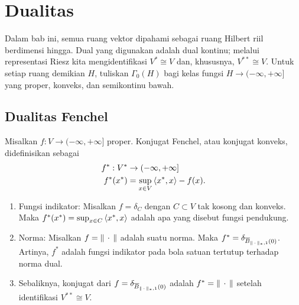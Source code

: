 \chapter{Dualitas}\label{chapter:duality}
Dalam bab ini, semua ruang vektor dipahami sebagai ruang Hilbert riil berdimensi hingga. Dual yang digunakan adalah dual kontinu; melalui representasi Riesz kita mengidentifikasi $V^*\cong V$ dan, khususnya, $V^{**}\cong V$. Untuk setiap ruang demikian $H$, tuliskan $\Gamma_0(H)$ bagi kelas fungsi $H\rightarrow(-\infty,+\infty]$ yang proper, konveks, dan semikontinu bawah.

\section{Dualitas Fenchel}

\begin{defn}
    Misalkan $f:V\rightarrow(-\infty,+\infty]$ proper. Konjugat Fenchel, atau konjugat konveks, didefinisikan sebagai
    \begin{equation}
        \begin{aligned}
            f^*:V^*&\rightarrow(-\infty,+\infty]\\
            f^*(x^*) &= \sup_{x\in V} \left\langle x^* , x\right\rangle - f(x).
        \end{aligned}
    \end{equation}
\end{defn}

\begin{example}
    \begin{enumerate}
        \item Fungsi indikator: Misalkan $f=\delta_C$ dengan $C\subset V$ tak kosong dan konveks. Maka $f^*(x^*) = \sup_{x\in C}\left\langle x^* , x\right\rangle$ adalah apa yang disebut fungsi pendukung.
        \item Norma: Misalkan $f = \|\,\cdot\,\|$ adalah suatu norma. Maka $f^* = \delta_{\overline{B}_{\|\,\cdot\,\|_*,1}(0)}$. Artinya, $f^*$ adalah fungsi indikator pada bola satuan tertutup terhadap norma dual.
        \item Sebaliknya, konjugat dari $f = \delta_{\overline{B}_{\|\,\cdot\,\|_*,1}(0)}$ adalah $f^* = \|\,\cdot\,\|$ setelah identifikasi $V^{**}\cong V$.
    \end{enumerate}
\end{example}

